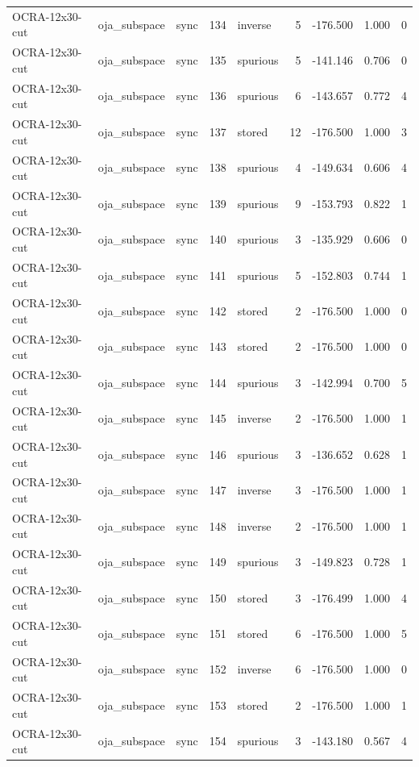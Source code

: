 \begin{tabular}{lllrlrrrr}
OCRA-12x30-cut & oja\_subspace & sync & 134 & inverse & 5 & -176.500 & 1.000 & 0 \\
OCRA-12x30-cut & oja\_subspace & sync & 135 & spurious & 5 & -141.146 & 0.706 & 0 \\
OCRA-12x30-cut & oja\_subspace & sync & 136 & spurious & 6 & -143.657 & 0.772 & 4 \\
OCRA-12x30-cut & oja\_subspace & sync & 137 & stored & 12 & -176.500 & 1.000 & 3 \\
OCRA-12x30-cut & oja\_subspace & sync & 138 & spurious & 4 & -149.634 & 0.606 & 4 \\
OCRA-12x30-cut & oja\_subspace & sync & 139 & spurious & 9 & -153.793 & 0.822 & 1 \\
OCRA-12x30-cut & oja\_subspace & sync & 140 & spurious & 3 & -135.929 & 0.606 & 0 \\
OCRA-12x30-cut & oja\_subspace & sync & 141 & spurious & 5 & -152.803 & 0.744 & 1 \\
OCRA-12x30-cut & oja\_subspace & sync & 142 & stored & 2 & -176.500 & 1.000 & 0 \\
OCRA-12x30-cut & oja\_subspace & sync & 143 & stored & 2 & -176.500 & 1.000 & 0 \\
OCRA-12x30-cut & oja\_subspace & sync & 144 & spurious & 3 & -142.994 & 0.700 & 5 \\
OCRA-12x30-cut & oja\_subspace & sync & 145 & inverse & 2 & -176.500 & 1.000 & 1 \\
OCRA-12x30-cut & oja\_subspace & sync & 146 & spurious & 3 & -136.652 & 0.628 & 1 \\
OCRA-12x30-cut & oja\_subspace & sync & 147 & inverse & 3 & -176.500 & 1.000 & 1 \\
OCRA-12x30-cut & oja\_subspace & sync & 148 & inverse & 2 & -176.500 & 1.000 & 1 \\
OCRA-12x30-cut & oja\_subspace & sync & 149 & spurious & 3 & -149.823 & 0.728 & 1 \\
OCRA-12x30-cut & oja\_subspace & sync & 150 & stored & 3 & -176.499 & 1.000 & 4 \\
OCRA-12x30-cut & oja\_subspace & sync & 151 & stored & 6 & -176.500 & 1.000 & 5 \\
OCRA-12x30-cut & oja\_subspace & sync & 152 & inverse & 6 & -176.500 & 1.000 & 0 \\
OCRA-12x30-cut & oja\_subspace & sync & 153 & stored & 2 & -176.500 & 1.000 & 1 \\
OCRA-12x30-cut & oja\_subspace & sync & 154 & spurious & 3 & -143.180 & 0.567 & 4 \\

\end{tabular}
